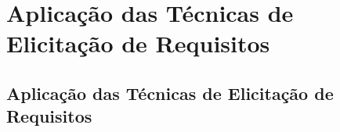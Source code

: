 \part{Aplicação das Técnicas de Elicitação de Requisitos}
\chapter[Aplicação das Técnicas de Elicitação de Requisitos]{Aplicação das Técnicas de Elicitação de Requisitos}